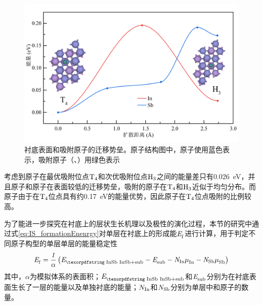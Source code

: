 \begin{figure}[htb]
    \includegraphics{pic/IS_DFT_adatomDiff.png}
    \caption{衬底表面和吸附原子的迁移势垒。原子结构图中，原子使用蓝色表示，吸附原子（、）用绿色表示}
    \label{fig:IS_DFT_adatomDiff}
\end{figure}

考虑到原子在最优吸附位点$\rm T_{4} \it$和次优吸附位点$\rm H_{3} \it$之间的能量差只有\SI{0.026}{\electronvolt}，并且原子和原子在表面较低的迁移势垒，吸附的原子在$\rm T_{4} \it$和$\rm H_{3} \it$近似于均匀分布。而原子由于在$\rm T_{4} \it$位点具有约\SI{0.17}{\electronvolt}的能量优势，因此原子在$\rm T_{4} \it$位点吸附的比例较高。

为了能进一步探究在衬底上的层状生长机理以及极性的演化过程，本节的研究中通过式\eqref{eq:IS_formationEnenrgy}对单层在衬底上的形成能$\it E_{\rm f}^{\rm } \it$进行计算，用于判定不同原子构型的单层单层的能量稳定性\chinesecolon
\begin{equation}
    \label{eq:IS_formationEnenrgy}
    \energyVar{f}{}=\frac{1}{\alpha}\left(\energyVar{\cemb{InSb}+sub}{}-\energyVar{sub}{}-N_{\rm In}\muVar{In}{}-N_{\rm Sb}\muVar{Sb}{}\right)
\end{equation}
其中，$\alpha$为模拟体系的表面积；$\energyVar{\cemb{InSb}+sub}{}$和$\it E_{\rm sub}^{\rm } \it$分别为在衬底表面生长了一层的能量以及单独衬底的能量；$N_{\rm In}$和$N_{\rm Sb}$分别为单层中和原子的数量。

